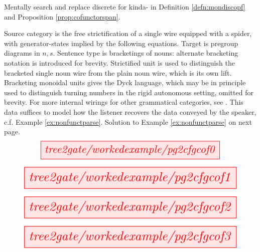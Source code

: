 \begin{defn}
Mentally search and replace discrete for kinda- in Definition \ref{defn:mondiscopf} and Proposition \ref{prop:cofunctorspan}.
\end{defn}

\clearpage
\newpage

\begin{myboxR}
\begin{example}\label{ex:bigexlift}
\end{example}
Source category is the free strictification of a single wire equipped with a spider, with generator-states implied by the following equations. Target is pregroup diagrams in $n,s$. Sentence type is bracketings of nouns: alternate bracketing notation is introduced for brevity. Strictified unit is used to distinguish the bracketed single noun wire from the plain noun wire, which is its own lift. Bracketing monoidal units gives the Dyck language, which may be in principle used to distinguish turning numbers in the rigid autonomous setting, omitted for brevity. For more internal wirings for other grammatical categories, see \citep{wang-mascianicaInternalWirings}. This data suffices to model how the listener recovers the data conveyed by the speaker, c.f. Example \ref{ex:nonfunctparse}. Solution to Example \ref{ex:nonfunctparse} on next page.
\[\resizebox{0.8\textwidth}{!}{\tikzfig{tree2gate/workedexample/pg2cfgcof0}}\]
\end{myboxR}

\begin{myboxB}
\[\resizebox{0.95\textwidth}{!}{\tikzfig{tree2gate/workedexample/pg2cfgcof1}}\]
\end{myboxB}

\begin{myboxB}
\[\resizebox{0.95\textwidth}{!}{\tikzfig{tree2gate/workedexample/pg2cfgcof2}}\]
\end{myboxB}

\begin{myboxB}
\[\resizebox{0.95\textwidth}{!}{\tikzfig{tree2gate/workedexample/pg2cfgcof3}}\]
\end{myboxB}

